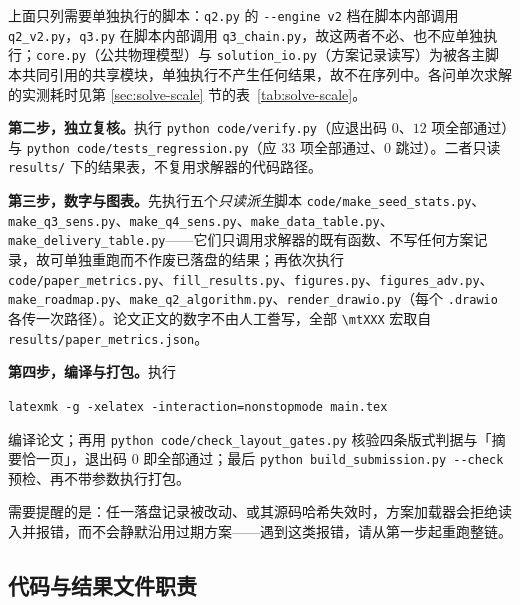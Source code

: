 \begin{sloppypar}
\noindent 上面只列需要单独执行的脚本：\texttt{q2.py} 的 \texttt{-{}-engine v2} 档在脚本内部调用 \texttt{q2\_v2.py}，\texttt{q3.py} 在脚本内部调用 \texttt{q3\_chain.py}，故这两者不必、也不应单独执行；\texttt{core.py}（公共物理模型）与 \texttt{solution\_io.py}（方案记录读写）为被各主脚本共同引用的共享模块，单独执行不产生任何结果，故不在序列中。各问单次求解的实测耗时见第 \ref{sec:solve-scale} 节的表~\ref{tab:solve-scale}。

\textbf{第二步，独立复核。}执行 \texttt{python code/verify.py}（应退出码 $0$、$12$ 项全部通过）与 \texttt{python code/tests\_regression.py}（应 $33$ 项全部通过、$0$ 跳过）。二者只读 \texttt{results/} 下的结果表，不复用求解器的代码路径。

\textbf{第三步，数字与图表。}先执行五个\emph{只读派生}脚本 \texttt{code/make\_seed\_stats.py}、\texttt{make\_q3\_sens.py}、\texttt{make\_q4\_sens.py}、\texttt{make\_data\_table.py}、\texttt{make\_delivery\_table.py}——它们只调用求解器的既有函数、不写任何方案记录，故可单独重跑而不作废已落盘的结果；再依次执行 \texttt{code/paper\_metrics.py}、\texttt{fill\_results.py}、\texttt{figures.py}、\texttt{figures\_adv.py}、\texttt{make\_roadmap.py}、\texttt{make\_q2\_algorithm.py}、\texttt{render\_drawio.py}（每个 \texttt{.drawio} 各传一次路径）。论文正文的数字不由人工誊写，全部 \texttt{\textbackslash mtXXX} 宏取自 \texttt{results/paper\_metrics.json}。

\textbf{第四步，编译与打包。}执行

\begin{center}
	\texttt{\small latexmk -g -xelatex -interaction=nonstopmode main.tex}
\end{center}

\noindent 编译论文；再用 \texttt{python code/check\_layout\_gates.py} 核验四条版式判据与「摘要恰一页」，退出码 $0$ 即全部通过；最后 \texttt{python build\_submission.py -{}-check} 预检、再不带参数执行打包。

\noindent 需要提醒的是：任一落盘记录被改动、或其源码哈希失效时，方案加载器会拒绝读入并报错，而不会静默沿用过期方案——遇到这类报错，请从第一步起重跑整链。
\end{sloppypar}

\subsection{代码与结果文件职责}

